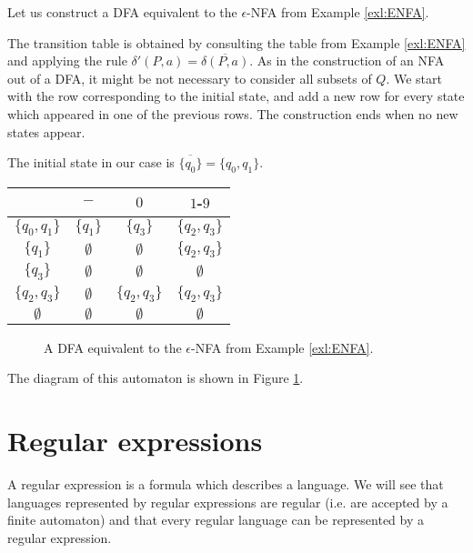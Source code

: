 \begin{page}
\setcounter{section}{1}
\setcounter{subsection}{4}
\setcounter{dfn}{17}
\label{portion:947}

\begin{exl}
Let us construct a DFA equivalent to the $\epsilon$-NFA from Example \ref{exl:ENFA}.

The transition table is obtained by consulting the table from Example \ref{exl:ENFA}
and applying the rule $\delta'(P, a) = \overline{\delta(P, a)}$.
As in the construction of an NFA out of a DFA, it might be not necessary to consider all subsets of $Q$.
We start with the row corresponding to the initial state,
and add a new row for every state which appeared in one of the previous rows.
The construction ends when no new states appear.

The initial state in our case is $\overline{\{q_0\}} = \{q_0, q_1\}$.
\begin{center}
\begin{tabular}{c|ccc}
& $-$ & $0$ & $1$-$9$\\\hline
$\{q_0, q_1\}$ & $\{q_1\}$ & $\{q_3\}$ & $\{q_2, q_3\}$\\
$\{q_1\}$ & $\emptyset$ & $\emptyset$ & $\{q_2, q_3\}$\\
$\{q_3\}$ & $\emptyset$ & $\emptyset$ & $\emptyset$\\
$\{q_2, q_3\}$ & $\emptyset$ & $\{q_2, q_3\}$ & $\{q_2, q_3\}$\\
$\emptyset$ & $\emptyset$ & $\emptyset$ & $\emptyset$
\end{tabular}
\end{center}

\begin{figure}[ht]
\begin{center}

\end{center}
\caption{A DFA equivalent to the $\epsilon$-NFA from Example \ref{exl:ENFA}.}
\label{fig:DFAFromENFA}
\end{figure}

The diagram of this automaton is shown in Figure \ref{fig:DFAFromENFA}.
\end{exl}

\end{page}

\begin{page}
\setcounter{section}{2}
\setcounter{subsection}{1}
\setcounter{dfn}{0}
\label{portion:949}

\section{Regular expressions}
A regular expression is a formula which describes a language.
We will see that languages represented by regular expressions are regular (i.e. are accepted by a finite automaton)
and that every regular language can be represented by a regular expression.


\end{page}

